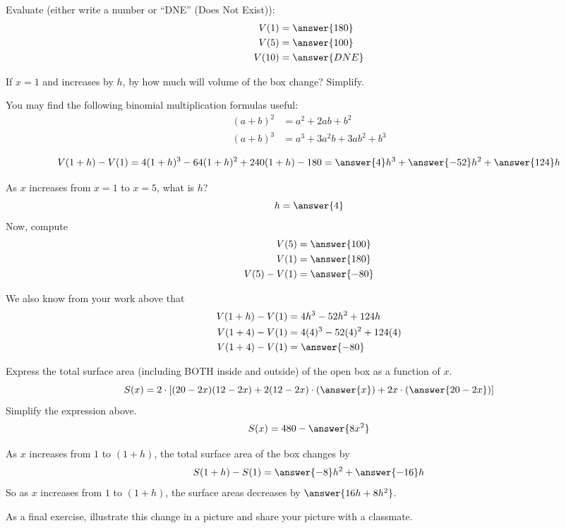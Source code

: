 \documentclass{ximera}
\begin{document}
\begin{exercise}
  Evaluate (either write a number or ``DNE'' (Does Not Exist)):
  \begin{align*}
    V(1) &= \answer{180}\\
    V(5) &= \answer{100}\\
    V(10) &= \answer{DNE}
  \end{align*}
\end{exercise}
\begin{exercise}
  If $x = 1$ and increases by $h$, by how much will volume of the box change? Simplify.
  \begin{hint}
    You may find the following binomial multiplication formulas useful:
    \begin{align*}
      (a+b)^2 &= a^2 + 2ab + b^2\\
      (a + b)^3 &= a^3 + 3 a^2 b + 3 ab^2 + b^3
    \end{align*}
  \end{hint}
  \[
  V(1+h) - V(1) =4(1+h)^3 -64(1+h)^2 +240(1+h)-180=\answer{4}h^3 +\answer{-52}h^2 + \answer{124}h
  \]
\end{exercise}

\begin{exercise}
  As $x$ increases from $x=1$ to $x=5$, what is $h$?
  \[
  h=\answer{4}
  \]
  Now, compute
  \begin{align*}
    V(5) &= \answer{100}\\
    V(1) &= \answer{180}\\
    V(5) - V(1) &= \answer{-80}
  \end{align*}
  \begin{exercise}
    We also know from your work above that
    \begin{align*}
      V(1+h) -V(1) &= 4h^3 -52h^2 + 124h\\
      V(1+4) -V(1) &= 4(4)^3 -52(4)^2 + 124(4)\\
      V(1+4) - V(1) &= \answer{-80}
    \end{align*}
  \end{exercise}
\end{exercise}

\begin{exercise}
  Express the total surface area (including BOTH inside and outside) of the open box
  as a function of $x$.
  \[
  S(x) = 2\cdot\left[(20-2x)(12-2x)+2(12-2x)\cdot\left(\answer{x}\right)+2x\cdot\left(\answer{20-2x}\right)\right]
  \]
  Simplify the expression above.
  \[
  S(x) =480- \answer{8x^2}
  \]
\end{exercise}
\begin{exercise}
  As $x$ increases from $1$ to $(1+h)$, the total surface area of the
  box changes by
  \[
  S(1+h) - S(1) = \answer{-8}h^2 + \answer{-16}h
  \]
  So as $x$ increases from $1$ to  $(1+h)$, the surface areas decreases by
  $\answer{16h+8h^2}$.

  As a final exercise, illustrate this change in a picture and share your picture with a classmate.
  \begin{multipleChoice}
  \end{multipleChoice}
\end{exercise}
\end{document}
